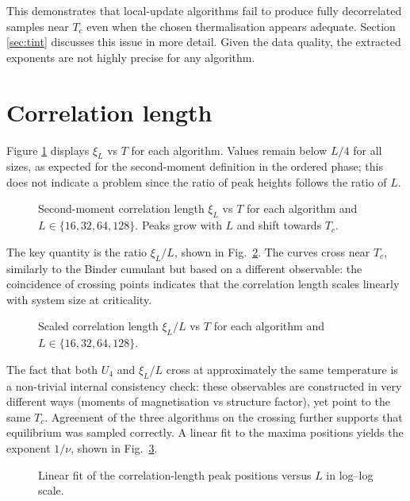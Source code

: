 This demonstrates that local-update algorithms fail to produce fully decorrelated samples near $T_c$ even when the chosen thermalisation appears adequate. Section \ref{sec:tint} discusses this issue in more detail. Given the data quality, the extracted exponents are not highly precise for any algorithm.

\section{Correlation length}

Figure \ref{fig:xi} displays $\xi_L$ vs $T$ for each algorithm. Values remain below $L/4$ for all sizes, as expected for the second-moment definition in the ordered phase; this does not indicate a problem since the ratio of peak heights follows the ratio of $L$.

\begin{figure}
  \centering
  
  \caption{Second-moment correlation length $\xi_L$ vs $T$ for each algorithm and $L\in\{16,32,64,128\}$. Peaks grow with $L$ and shift towards $T_c$.}
  \label{fig:xi}
\end{figure}

The key quantity is the ratio $\xi_L/L$, shown in Fig.~\ref{fig:xi_ratio}. The curves cross near $T_c$, similarly to the Binder cumulant but based on a different observable: the coincidence of crossing points indicates that the correlation length scales linearly with system size at criticality.

\begin{figure}
  \centering
  
  \caption{Scaled correlation length $\xi_L/L$ vs $T$ for each algorithm and $L\in\{16,32,64,128\}$.}
  \label{fig:xi_ratio}
\end{figure}

The fact that both $U_4$ and $\xi_L/L$ cross at approximately the same temperature is a non-trivial internal consistency check: these observables are constructed in very different ways (moments of magnetisation vs structure factor), yet point to the same $T_c$. Agreement of the three algorithms on the crossing further supports that equilibrium was sampled correctly. A linear fit to the maxima positions yields the exponent $1/\nu$, shown in Fig.~\ref{fig:xi_scaling}.

\begin{figure}
  \centering
  
  \caption{Linear fit of the correlation-length peak positions versus $L$ in log–log scale.}
  \label{fig:xi_scaling}
\end{figure}

